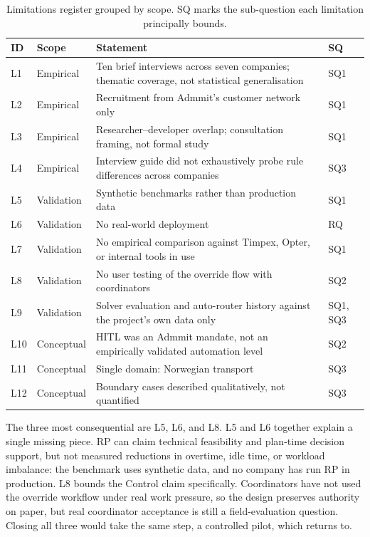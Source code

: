 \begin{table}[h]
\centering
\caption{Limitations register grouped by scope. SQ marks the sub-question each limitation principally bounds.}
\label{tab:limitations-register}
\small
\begin{tabular}{p{}p{}p{}p{}}
\toprule
\textbf{ID} & \textbf{Scope} & \textbf{Statement} & \textbf{SQ} \\
\midrule
L1  & Empirical    & Ten brief interviews across seven companies; thematic coverage, not statistical generalisation & SQ1 \\
L2  & Empirical    & Recruitment from Admmit's customer network only                                          & SQ1 \\
L3  & Empirical    & Researcher--developer overlap; consultation framing, not formal study                    & SQ1 \\
L4  & Empirical    & Interview guide did not exhaustively probe rule differences across companies            & SQ3 \\
\midrule
L5  & Validation   & Synthetic benchmarks rather than production data                                         & SQ1 \\
L6  & Validation   & No real-world deployment                                                                 & RQ \\
L7  & Validation   & No empirical comparison against Timpex, Opter, or internal tools in use                  & SQ1 \\
L8  & Validation   & No user testing of the override flow with coordinators                                   & SQ2 \\
L9  & Validation   & Solver evaluation and auto-router history against the project's own data only            & SQ1, SQ3 \\
\midrule
L10 & Conceptual   & HITL was an Admmit mandate, not an empirically validated automation level                & SQ2 \\
L11 & Conceptual   & Single domain: Norwegian transport                                                       & SQ3 \\
L12 & Conceptual   & Boundary cases described qualitatively, not quantified                                   & SQ3 \\
\bottomrule
\end{tabular}
\end{table}

The three most consequential are L5, L6, and L8. L5 and L6 together explain a single missing piece. RP can claim technical feasibility and plan-time decision support, but not measured reductions in overtime, idle time, or workload imbalance: the benchmark uses synthetic data, and no company has run RP in production. L8 bounds the Control claim specifically. Coordinators have not used the override workflow under real work pressure, so the design preserves authority on paper, but real coordinator acceptance is still a field-evaluation question. Closing all three would take the same step, a controlled pilot, which  returns to.


